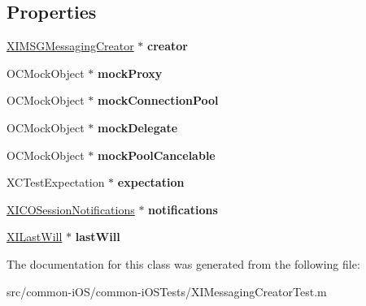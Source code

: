 \subsection*{Properties}
\begin{DoxyCompactItemize}
\item 
\hypertarget{interface_x_i_messaging_creator_test_a9f6050e079a6bc6964c5ad1c32e308a1}{}\label{interface_x_i_messaging_creator_test_a9f6050e079a6bc6964c5ad1c32e308a1} 
\hyperlink{interface_x_i_m_s_g_messaging_creator}{X\+I\+M\+S\+G\+Messaging\+Creator} $\ast$ {\bfseries creator}
\item 
\hypertarget{interface_x_i_messaging_creator_test_aa41f9463f6fb99406a0b304fdf4044de}{}\label{interface_x_i_messaging_creator_test_aa41f9463f6fb99406a0b304fdf4044de} 
O\+C\+Mock\+Object $\ast$ {\bfseries mock\+Proxy}
\item 
\hypertarget{interface_x_i_messaging_creator_test_acb199d1f79f87d7b96173ecd1e340f81}{}\label{interface_x_i_messaging_creator_test_acb199d1f79f87d7b96173ecd1e340f81} 
O\+C\+Mock\+Object $\ast$ {\bfseries mock\+Connection\+Pool}
\item 
\hypertarget{interface_x_i_messaging_creator_test_a6417273e46e5fef6699beb49915ec2d0}{}\label{interface_x_i_messaging_creator_test_a6417273e46e5fef6699beb49915ec2d0} 
O\+C\+Mock\+Object $\ast$ {\bfseries mock\+Delegate}
\item 
\hypertarget{interface_x_i_messaging_creator_test_af7119c72f25524b5559b0e4a23279065}{}\label{interface_x_i_messaging_creator_test_af7119c72f25524b5559b0e4a23279065} 
O\+C\+Mock\+Object $\ast$ {\bfseries mock\+Pool\+Cancelable}
\item 
\hypertarget{interface_x_i_messaging_creator_test_afd44890f369dea482a6086517ec7c68c}{}\label{interface_x_i_messaging_creator_test_afd44890f369dea482a6086517ec7c68c} 
X\+C\+Test\+Expectation $\ast$ {\bfseries expectation}
\item 
\hypertarget{interface_x_i_messaging_creator_test_a18d1814aba67859ff7306c41e8dff0f8}{}\label{interface_x_i_messaging_creator_test_a18d1814aba67859ff7306c41e8dff0f8} 
\hyperlink{interface_x_i_c_o_session_notifications}{X\+I\+C\+O\+Session\+Notifications} $\ast$ {\bfseries notifications}
\item 
\hypertarget{interface_x_i_messaging_creator_test_ad6462c2e55865121e035b8c8e94deb5d}{}\label{interface_x_i_messaging_creator_test_ad6462c2e55865121e035b8c8e94deb5d} 
\hyperlink{class_x_i_last_will}{X\+I\+Last\+Will} $\ast$ {\bfseries last\+Will}
\end{DoxyCompactItemize}


The documentation for this class was generated from the following file\+:\begin{DoxyCompactItemize}
\item 
src/common-\/i\+O\+S/common-\/i\+O\+S\+Tests/X\+I\+Messaging\+Creator\+Test.\+m\end{DoxyCompactItemize}
